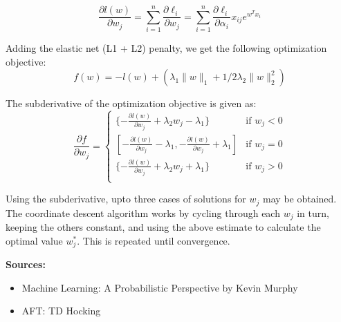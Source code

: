 \documentclass[12pt,a4paper]{report}
\begin{document}
\begin{equation} \label{lld}
\frac{\partial{l(w)}}{\partial{w_j}} = \sum_{i=1}^{n} \frac{\partial{\ell_i}}{\partial{w_j}}
									 = \sum_{i=1}^{n} \frac{\partial{\ell_i}}{\partial{\alpha_i}} x_{ij} e^{w^Tx_i}
\end{equation}


Adding the elastic net (L1 + L2) penalty, we get the following optimization objective:
\begin{equation} \label{objective}
f(w) = -l(w) + (\lambda_1 \|w\|_1 + 1/2 \lambda_2 \|w\|_2^2)
\end{equation}

The subderivative of the optimization objective is given as:
\begin{equation} \label{subderivative}
\frac{\partial{f}}{\partial{w_j}} = \begin{cases}
										\{-\frac{\partial{l(w)}}{\partial{w_j}} + \lambda_2 w_j -\lambda_1\} & \mbox{if }  w_j<0 \\
										[-\frac{\partial{l(w)}}{\partial{w_j}} -\lambda_1, -\frac{\partial{l(w)}}{\partial{w_j}} +\lambda_1] & \mbox{if }  w_j=0 \\
										\{-\frac{\partial{l(w)}}{\partial{w_j}} + \lambda_2 w_j +\lambda_1\} & \mbox{if } w_j>0 \\
									\end{cases}
\end{equation}

Using the subderivative, upto three cases of solutions for $w_j$ may be obtained. The coordinate descent algorithm works by
cycling through each $w_j$ in turn, keeping the others constant, and using the above estimate to calculate the optimal value
$w^*_j$. This is repeated until convergence.

\vspace{8mm}
\textbf{Sources:}
\begin{itemize}
\item Machine Learning: A Probabilistic Perspective by Kevin Murphy
\item AFT: TD Hocking
\end{itemize}
\end{document}
